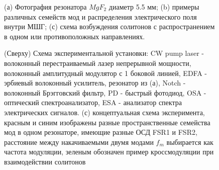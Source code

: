 
\begin{figure}[ht]
\begin{minipage}[ht]{1\linewidth}
\end{minipage}
\caption{(а) Фотография резонатора $MgF_2$ диаметр 5.5 мм; (b) примеры различных семейств мод и распределения электрического поля внутри МШГ; (с) схема возбуждения солитонов с распространением в одном или противоположных направлениях.}
\label{Figure1_V1_c}
\end{figure}

\begin{figure}[ht]
\begin{minipage}[ht]{1\linewidth}
\end{minipage}
\caption{(Сверху) Схема экспериментальной установки: CW pump laser - волоконный перестраиваемый лазер непрерывной мощности, волоконный амплитудный модулятор с 1 боковой линией, EDFA - эрбиевый волоконный усилитель, резонатор из (а), Notch - волоконный Брэгговский фильтр, PD - быстрый фотодиод, OSA - оптический спектроанализатор, ESA - анализатор спектра электрических сигналов. (с) концептуальная схема эксперимента, красным и синим изображены разные пространственные семейства мод в одном резонаторе, имеющие разные ОСД FSR1 и FSR2, расстояние между накачиваемыми двумя модами $f_m$ выбирается как частота модуляции, зеленым обозначен пример кроссмодуляции при взаимодействии солитонов}
\label{Figure1_V1_c}
\end{figure}


